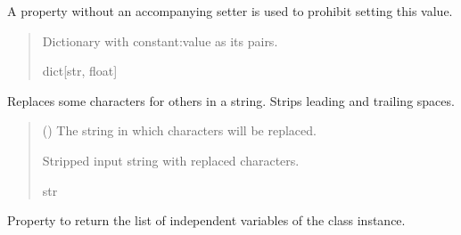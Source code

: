 \documentclass[letterpaper,10pt,english]{sphinxmanual}
\begin{document}
\begin{fulllineitems}
\begin{fulllineitems}
\sphinxAtStartPar
A property without an accompanying setter is used to prohibit setting this value.
\begin{quote}\begin{description}
\sphinxAtStartPar
Dictionary with constant:value as its pairs.

\sphinxAtStartPar
dict{[}str, float{]}

\end{description}\end{quote}

\end{fulllineitems}


\begin{fulllineitems}
\label{\detokenize{VPCModel:src.VPCModel.VPCModel.format_eq}}
\pysigstartsignatures
{}
\pysigstopsignatures
\sphinxAtStartPar
Replaces some characters for others in a string. Strips leading and trailing spaces.
\begin{quote}\begin{description}
\sphinxAtStartPar
{} () \textendash{} The string in which characters will be replaced.

\sphinxAtStartPar
Stripped input string with replaced characters.

\sphinxAtStartPar
str

\end{description}\end{quote}

\end{fulllineitems}


\begin{fulllineitems}
\label{\detokenize{VPCModel:src.VPCModel.VPCModel.independent_var}}
\pysigstartsignatures
{}
\pysigstopsignatures
\sphinxAtStartPar
Property to return the list of independent variables of the class instance.


\end{fulllineitems}
\end{fulllineitems}
\end{document}
